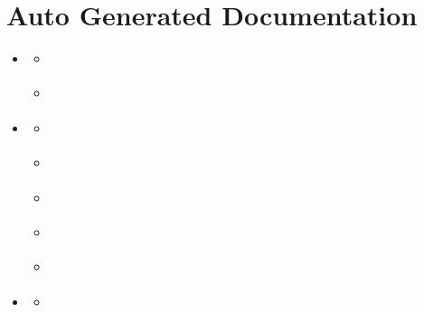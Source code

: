 \documentclass[letterpaper,10pt,english]{sphinxmanual}
\begin{document}
\chapter{Auto Generated Documentation}
\label{\detokenize{api:auto-generated-documentation}}\label{\detokenize{api::doc}}
\begin{sphinxShadowBox}
\begin{itemize}
\item {} 
\label{\detokenize{api:id1}}{\hyperref[\detokenize{api:porgrams}]{}}
\begin{itemize}
\item {} 
\label{\detokenize{api:id2}}{\hyperref[\detokenize{api:install}]{}}

\item {} 
\label{\detokenize{api:id3}}{\hyperref[\detokenize{api:submit}]{}}

\end{itemize}

\item {} 
\label{\detokenize{api:id4}}{\hyperref[\detokenize{api:classes}]{}}
\begin{itemize}
\item {} 
\label{\detokenize{api:id5}}{\hyperref[\detokenize{api:controlfile}]{}}

\item {} 
\label{\detokenize{api:id6}}{\hyperref[\detokenize{api:ecflexpart}]{}}

\item {} 
\label{\detokenize{api:id7}}{\hyperref[\detokenize{api:gributil}]{}}

\item {} 
\label{\detokenize{api:id8}}{\hyperref[\detokenize{api:module-MarsRetrieval}]{}}

\item {} 
\label{\detokenize{api:id9}}{\hyperref[\detokenize{api:uiofiles}]{}}

\end{itemize}

\item {} 
\label{\detokenize{api:id10}}{\hyperref[\detokenize{api:modules}]{}}
\begin{itemize}
\item {} 
\label{\detokenize{api:id11}}{\hyperref[\detokenize{api:get-mars-data}]{}}


\end{itemize}
\end{itemize}
\end{sphinxShadowBox}
\end{document}
